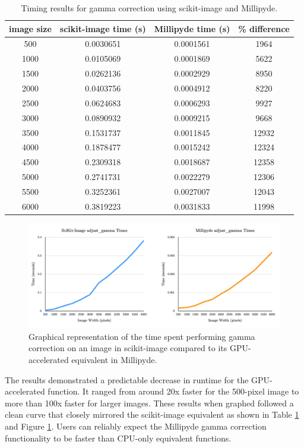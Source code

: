 \begin{table}[h!]
\centering
\begin{tabular}{ |c|c|c|c| } 
\hline
image size & scikit-image time (s) & Millipyde time (s) & \% difference \\
\hline
500&0.0030651&0.0001561&1964 \\
1000&0.0105069&0.0001869&5622 \\
1500&0.0262136&0.0002929&8950 \\
2000&0.0403756&0.0004912&8220 \\ 
2500&0.0624683&0.0006293&9927 \\
3000&0.0890932&0.0009215&9668 \\
3500&0.1531737&0.0011845&12932 \\
4000&0.1878477&0.0015242&12324 \\
4500&0.2309318&0.0018687&12358 \\ 
5000&0.2741731&0.0022279&12306 \\
5500&0.3252361&0.0027007&12043 \\
6000&0.3819223&0.0031833&11998 \\
\hline
\end{tabular}
\caption{Timing results for gamma correction using scikit-image and Millipyde.}
\label{gammaTable}
\end{table}

\begin{figure}[H]
\includegraphics[width=\textwidth]{figures/GammaComparison.png}
\centering
\caption{Graphical representation of the time spent performing gamma correction on an image in scikit-image compared to its GPU-accelerated equivalent in Millipyde.}
\label{gammaComparison}
\end{figure}

\quad The results demonstrated a predictable decrease in runtime for the GPU-accelerated function. It ranged from around 20x faster for the 500-pixel image to more than 100x faster for larger images. These results when graphed followed a clean curve that closely mirrored the scikit-image equivalent as shown in Table \ref{gammaTable} and Figure \ref{gammaComparison}. Users can reliably expect the Millipyde gamma correction functionality to be faster than CPU-only equivalent functions.

